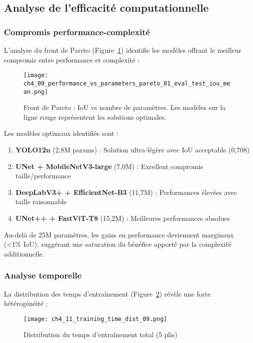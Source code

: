 \subsection{Analyse de l'efficacité computationnelle}

\subsubsection{Compromis performance-complexité}

L'analyse du front de Pareto (Figure~\ref{fig:pareto_params}) identifie les modèles offrant le meilleur compromis entre performance et complexité :

\begin{figure}[htbp]
    \centering
    \texttt{[image: ch4\_09\_performance\_vs\_parameters\_pareto\_01\_eval\_test\_iou\_mean.png]}
    \caption{Front de Pareto : IoU vs nombre de paramètres. Les modèles sur la ligne rouge représentent les solutions optimales.}
    \label{fig:pareto_params}
\end{figure}

Les modèles optimaux identifiés sont :
\begin{enumerate}
    \item \textbf{YOLO12n} (2,8M params) : Solution ultra-légère avec IoU acceptable (0,708)
    \item \textbf{UNet + MobileNetV3-large} (7,0M) : Excellent compromis taille/performance
    \item \textbf{DeepLabV3+ + EfficientNet-B3} (11,7M) : Performances élevées avec taille raisonnable
    \item \textbf{UNet++ + FastViT-T8} (15,2M) : Meilleures performances absolues
\end{enumerate}

Au-delà de 25M paramètres, les gains en performance deviennent marginaux (<1\% IoU), suggérant une saturation du bénéfice apporté par la complexité additionnelle.

\subsubsection{Analyse temporelle}

La distribution des temps d'entraînement (Figure~\ref{fig:training_time_dist}) révèle une forte hétérogénéité :

\begin{figure}[htbp]
    \centering
    \texttt{[image: ch4\_11\_training\_time\_dist\_09.png]}
    \caption{Distribution du temps d'entraînement total (5 plis)}
    \label{fig:training_time_dist}
\end{figure}


